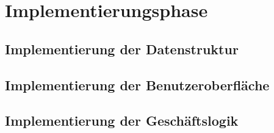 \newpage
\section{Implementierungsphase}
\label{implementierungsphase}

\subsection{Implementierung der Datenstruktur}
\label{datenstruktur}

\subsection{Implementierung der Benutzeroberfläche}
\label{oberflacheimplemetieren}

\subsection{Implementierung der Geschäftslogik}
\label{geschaeftslogikimplementieren}
